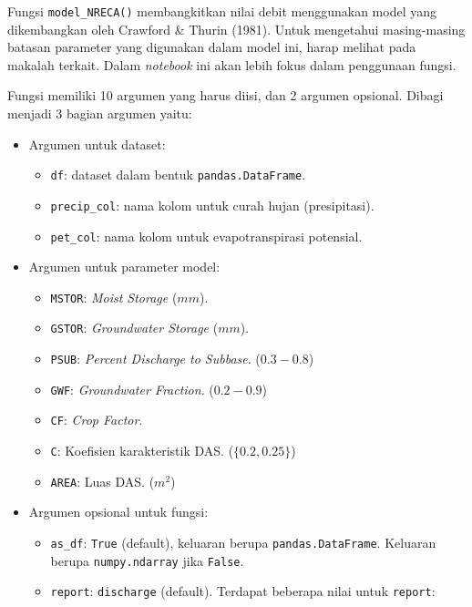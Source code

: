 \documentclass[11pt]{article}
\providecommand{\tightlist}{%
      \setlength{\itemsep}{0pt}\setlength{\parskip}{0pt}}
\begin{document}
Fungsi \texttt{model\_NRECA()} membangkitkan nilai debit menggunakan
model yang dikembangkan oleh Crawford \& Thurin (1981). Untuk mengetahui
masing-masing batasan parameter yang digunakan dalam model ini, harap
melihat pada makalah terkait. Dalam \emph{notebook} ini akan lebih fokus
dalam penggunaan fungsi.

Fungsi memiliki 10 argumen yang harus diisi, dan 2 argumen opsional.
Dibagi menjadi 3 bagian argumen yaitu:

\begin{itemize}
\tightlist
\item
  Argumen untuk dataset:

  \begin{itemize}
  \tightlist
  \item
    \texttt{df}: dataset dalam bentuk \texttt{pandas.DataFrame}.
  \item
    \texttt{precip\_col}: nama kolom untuk curah hujan (presipitasi).
  \item
    \texttt{pet\_col}: nama kolom untuk evapotranspirasi potensial.
  \end{itemize}
\item
  Argumen untuk parameter model:

  \begin{itemize}
  \tightlist
  \item
    \texttt{MSTOR}: \emph{Moist Storage} (\(mm\)).
  \item
    \texttt{GSTOR}: \emph{Groundwater Storage} (\(mm\)).
  \item
    \texttt{PSUB}: \emph{Percent Discharge to Subbase}. (\(0.3-0.8\))
  \item
    \texttt{GWF}: \emph{Groundwater Fraction}. (\(0.2-0.9\))
  \item
    \texttt{CF}: \emph{Crop Factor}.
  \item
    \texttt{C}: Koefisien karakteristik DAS. (\(\{0.2,0.25\}\))
  \item
    \texttt{AREA}: Luas DAS. (\(m^2\))
  \end{itemize}
\item
  Argumen opsional untuk fungsi:

  \begin{itemize}
  \tightlist
  \item
    \texttt{as\_df}: \texttt{True} (default), keluaran berupa
    \texttt{pandas.DataFrame}. Keluaran berupa \texttt{numpy.ndarray}
    jika \texttt{False}.
  \item
    \texttt{report}: \texttt{discharge} (default). Terdapat beberapa
    nilai untuk \texttt{report}:


\end{itemize}
\end{itemize}
\end{document}
